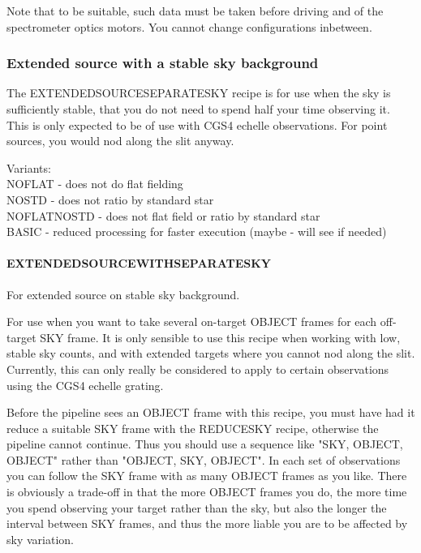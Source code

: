 \documentclass[twoside,11pt]{article}
\renewcommand{\_}{\texttt{\symbol{95}}}
\begin{document}
Note that to be suitable, such data must be taken before driving and
of the spectrometer optics motors. You cannot change configurations
inbetween.


\subsubsection{Extended source with a stable sky background}

The EXTENDED\_SOURCE\_SEPARATE\_SKY recipe is for use when the sky is
sufficiently stable, that you do not need to spend half your time
observing it. This is only expected to be of use with CGS4 echelle
observations. For point sources, you would nod along the slit anyway.

Variants: \\
\_NOFLAT - does not do flat fielding \\
\_NOSTD - does not ratio by standard star \\
\_NOFLAT\_NOSTD - does not flat field or ratio by standard star \\
\_BASIC - reduced processing for faster execution (maybe - will see if needed) \\

\paragraph{EXTENDED\_SOURCE\_WITH\_SEPARATE\_SKY\label{EXTENDED_SOURCE_WITH_SEPARATE_SKY}}


For extended source on stable sky background.


\mbox{}


For use when you want to take several on-target OBJECT frames for each
off-target SKY frame. It is only sensible to use this recipe when
working with low, stable sky counts, and with extended targets where
you cannot nod along the slit. Currently, this can only really be
considered to apply to certain observations using the CGS4 echelle
grating.



Before the pipeline sees an OBJECT frame with this recipe, you must
have had it reduce a suitable SKY frame with the REDUCE\_SKY recipe,
otherwise the pipeline cannot continue. Thus you should use a sequence
like "SKY, OBJECT, OBJECT" rather than "OBJECT, SKY, OBJECT". In each
set of observations you can follow the SKY frame with as many OBJECT
frames as you like. There is obviously a trade-off in that the more
OBJECT frames you do, the more time you spend observing your target
rather than the sky, but also the longer the interval between SKY
frames, and thus the more liable you are to be affected by sky
variation.
\end{document}
